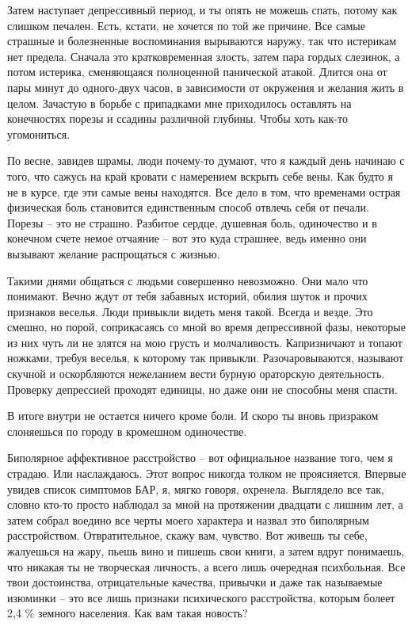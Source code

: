 \documentclass[
]{book}
\begin{document}
Затем наступает депрессивный период, и ты опять не можешь спать, потому как слишком печален. Есть, кстати, не хочется по той же причине. Все самые страшные и болезненные воспоминания вырываются наружу, так что истерикам нет предела. Сначала это кратковременная злость, затем пара гордых слезинок, а потом истерика, сменяющаяся полноценной панической атакой. Длится она от пары минут до одного-двух часов, в зависимости от окружения и желания жить в целом. Зачастую в борьбе с припадками мне приходилось оставлять на конечностях порезы и ссадины различной глубины. Чтобы хоть как-то угомониться.

По весне, завидев шрамы, люди почему-то думают, что я каждый день начинаю с того, что сажусь на край кровати с намерением вскрыть себе вены. Как будто я не в курсе, где эти самые вены находятся. Все дело в том, что временами острая физическая боль становится единственным способ отвлечь себя от печали. Порезы -- это не страшно. Разбитое сердце, душевная боль, одиночество и в конечном счете немое отчаяние -- вот это куда страшнее, ведь именно они вызывают желание распрощаться с жизнью.

Такими днями общаться с людьми совершенно невозможно. Они мало что понимают. Вечно ждут от тебя забавных историй, обилия шуток и прочих признаков веселья. Люди привыкли видеть меня такой. Всегда и везде. Это смешно, но порой, соприкасаясь со мной во время депрессивной фазы, некоторые из них чуть ли не злятся на мою грусть и молчаливость. Капризничают и топают ножками, требуя веселья, к которому так привыкли. Разочаровываются, называют скучной и оскорбляются нежеланием вести бурную ораторскую деятельность. Проверку депрессией проходят единицы, но даже они не способны меня спасти.

В итоге внутри не остается ничего кроме боли. И скоро ты вновь призраком слоняешься по городу в кромешном одиночестве.

Биполярное аффективное расстройство -- вот официальное название того, чем я страдаю. Или наслаждаюсь. Этот вопрос никогда толком не проясняется. Впервые увидев список симптомов БАР, я, мягко говоря, охренела. Выглядело все так, словно кто-то просто наблюдал за мной на протяжении двадцати с лишним лет, а затем собрал воедино все черты моего характера и назвал это биполярным расстройством. Отвратительное, скажу вам, чувство. Вот живешь ты себе, жалуешься на жару, пьешь вино и пишешь свои книги, а затем вдруг понимаешь, что никакая ты не творческая личность, а всего лишь очередная психбольная. Все твои достоинства, отрицательные качества, привычки и даже так называемые изюминки -- это все лишь признаки психического расстройства, которым болеет 2,4 \% земного населения. Как вам такая новость?
\end{document}
